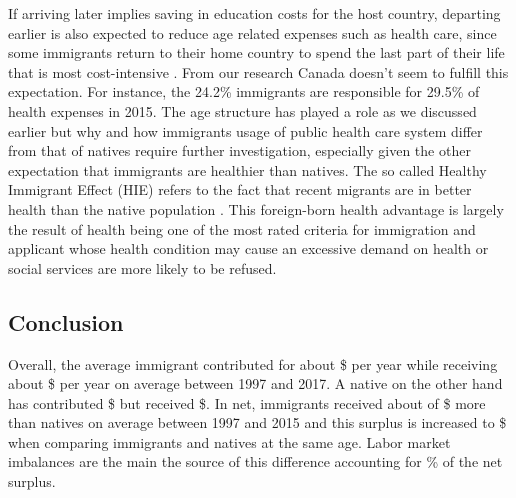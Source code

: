 \vspace{0.7em}\par
If arriving later implies saving in education costs for the host country, departing earlier is also expected to reduce age related expenses such as health care, since some immigrants return to their home country to spend the last part of their life that is most cost-intensive \citep{Bratsberg:2014cl}.
From our research Canada doesn't seem to fulfill this expectation.
For instance, the 24.2\% immigrants are responsible for 29.5\% of health expenses in 2015.
The age structure has played a role as we discussed earlier but why and how immigrants usage of public health care system differ from that of natives require further investigation, especially given the other expectation that immigrants are healthier than natives.
The so called Healthy Immigrant Effect (HIE) refers to the fact that recent migrants are in better health than the native population \citep{Ichou:2019ik,Vang:2016di}.
This foreign-born health advantage is largely the result of health being one of the most rated criteria for immigration and applicant whose health condition may cause an excessive demand on health or social services are more likely to be refused.

\subsection{Conclusion}

Overall, the average immigrant contributed for about \$ per year while receiving about \$ per year on average between 1997 and 2017.
A native on the other hand has contributed \$ but received \$.
In net, immigrants received about of \$ more than natives on average between 1997 and 2015 and this surplus is increased to \$ when comparing immigrants and natives at the same age.
Labor market imbalances are the main the source of this difference accounting for  \% of the net surplus.

